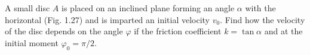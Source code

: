 \item A small disc \( A \) is placed on an inclined plane forming an angle \( \alpha \) with the horizontal (Fig. 1.27) and is imparted an initial velocity \( v_0 \). Find how the velocity of the disc depends on the angle \( \varphi \) if the friction coefficient \( k = \tan \alpha \) and at the initial moment \( \varphi_0 = \pi/2 \).
    \begin{center}
    \end{center}